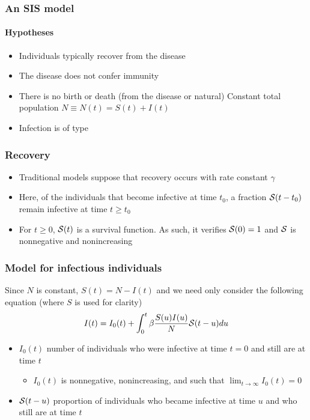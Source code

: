 \documentclass[aspectratio=169]{beamer}\usepackage[]{graphicx}\usepackage[]{xcolor}
\begin{document}
\begin{frame}\frametitle{An SIS model}
\framesubtitle{Hypotheses}
\begin{itemize}
\item Individuals typically recover from the disease
\vfill
\item The disease does not confer immunity
\vfill
\item There is no birth or death (from the disease or natural) \newline\imply\;
Constant total population $N\equiv N(t)=S(t)+I(t)$
\vfill
\item Infection is of  type
\end{itemize}
\end{frame}


\begin{frame}\frametitle{Recovery}
\begin{itemize}
\item Traditional models suppose that recovery occurs with rate constant
$\gamma$
\vfill
\item Here, of the individuals that become
infective at time $t_0$, a fraction $\S(t-t_0)$ remain infective at
time $t\geq t_0$
\vfill
\item \imply\;
For $t\geq 0$, $\S(t)$ is a survival function. As such, it verifies
$\S(0)=1$ and $\S$ is nonnegative and nonincreasing
\end{itemize}
\end{frame}


\begin{frame}\frametitle{Model for infectious individuals}
Since $N$ is constant, $S(t)=N-I(t)$ and we need only
consider the following equation (where $S$ is used for clarity)
\begin{equation}
I(t) = I_0(t)+ \int_0^t\beta\frac{S(u)I(u)}{N} \S(t-u) du
\label{eq:SIS_I} 
\end{equation}
\vfill
\begin{itemize}
\item $I_0(t)$ number of individuals who were infective at time
$t=0$ and still are at time $t$
\begin{itemize}
\item $I_0(t)$ is nonnegative, nonincreasing, and
such that $\lim_{t\to\infty}I_0(t)=0$
\end{itemize}
\item $\S(t-u)$ proportion of individuals who became infective at time $u$ and who still are at time $t$
\end{itemize}
\end{frame}
\end{document}
